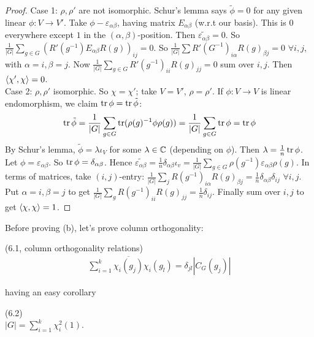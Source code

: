 \documentclass[a4paper]{article}
\begin{document}
\begin{proof}
Case 1: $\rho,\rho'$ are not isomorphic. Schur's lemma says $\tilde{\phi} = 0$ for any given linear $\phi:V \to V'$. Take $\phi - \varepsilon_{\alpha\beta}$, having matrix $E_{\alpha\beta}$ (w.r.t our basis). This is $0$ everywhere except $1$ in the $(\alpha,\beta)$-position. Then $\tilde{\varepsilon_{\alpha\beta}} = 0$. So $\frac{1}{|G|} \sum_{g \in G} (R'(g^{-1}) E_{\alpha\beta} R(g))_{ij} = 0$. So $\frac{1}{|G|} \sum R'(G^{-1})_{i\alpha} R(g)_{\beta j} =0 $ $\forall i,j$, with $\alpha = i, \beta = j$. Now $\frac{1}{|G|} \sum_{g \in G} R'(g^{-1})_{ii} R(g)_{jj} = 0$ sum over $i,j$. Then $\langle \chi',\chi\rangle = 0$.\\
Case 2: $\rho,\rho'$ isomorphic. So $\chi = \chi'$; take $V=V'$, $\rho = \rho'$. If $\phi:V \to V$ is linear endomorphism, we claim $\operatorname{tr} \phi = \operatorname{tr} \tilde{\phi}$:
\begin{equation*}
\begin{aligned}
\operatorname{tr} \tilde{\phi} = \frac{1}{|G|} \sum_{g \in G} \operatorname{tr}(\rho(g)^{-1} \phi \rho(g)) = \frac{1}{|G|} \sum_{g \in G} \operatorname{tr} \phi = \operatorname{tr} \phi
\end{aligned}
\end{equation*}
By Schur's lemma, $\tilde{\phi} = \lambda\iota_V$ for some $\lambda \in \mathbb{C}$ (depending on $\phi$). Then $\lambda = \frac{1}{n} \operatorname{tr}\phi$. Let $\phi = \varepsilon_{\alpha\beta}$. So $\operatorname{tr} \phi = \delta_{\alpha\beta}$. Hence $\tilde{\varepsilon_{\alpha\beta}} = \frac{1}{n} \delta_{\alpha\beta}\iota_v = \frac{1}{|G|} \sum_{g \in G} \rho(g^{-1}) \varepsilon_{\alpha\beta} \rho(g)$. In terms of matrices, take $(i,j)$-entry: $\frac{1}{|G|} \sum_j R(g^{-1})_{i \alpha} R(g)_{\beta j} = \frac{1}{n} \delta_{\alpha\beta}\delta_{ij}$ $\forall i,j$. Put $\alpha = i,\beta =j $ to get $\frac{1}{|G|} \sum_g R(g^{-1})_{ii} R(g)_{jj} = \frac{1}{n} \delta_{ij}$. Finally sum over $i,j$ to get $\langle \chi,\chi \rangle = 1$.
\end{proof}

Before proving (b), let's prove column orthogonality:

\begin{thm} (6.1, column orthogonality relations)\\
\begin{equation*}
\begin{aligned}
\sum_{i=1}^k \overline{\chi_i(g_j)} \chi_i (g_l) = \delta_{jl} |C_G(g_j)|
\end{aligned}
\end{equation*}
\end{thm}
having an easy corollary
\begin{coro} (6.2)\\
$|G| =\sum_{i=1}^k \chi_i^2(1)$.
\end{coro}
\end{document}
